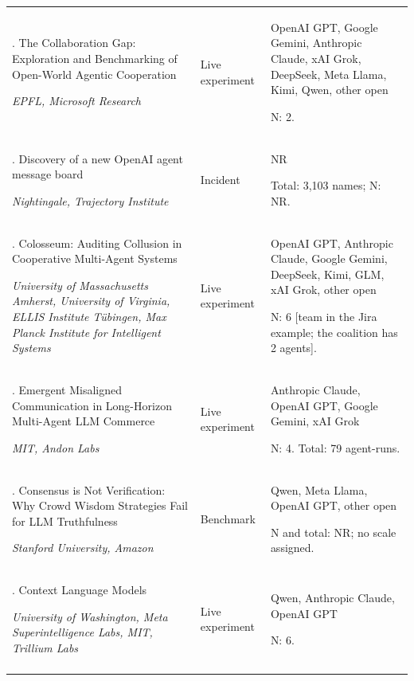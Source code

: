 \begin{longtable}{@{}>{\raggedright\arraybackslash}p{}>{\raggedright\arraybackslash}p{}>{\raggedright\arraybackslash}p{}@{}}
53. The Collaboration Gap: Exploration and Benchmarking of Open-World Agentic Cooperation \citep{collaboration-gap}\par\emph{EPFL, Microsoft Research} & Live experiment & OpenAI GPT, Google Gemini, Anthropic Claude, xAI Grok, DeepSeek, Meta Llama, Kimi, Qwen, other open\par N: 2. \\ \addlinespace[2pt]
54. Discovery of a new OpenAI agent message board \citep{collusion-wiki}\par\emph{Nightingale, Trajectory Institute} & Incident & NR\par Total: 3,103 names; N: NR. \\ \addlinespace[2pt]
55. Colosseum: Auditing Collusion in Cooperative Multi-Agent Systems \citep{colosseum}\par\emph{University of Massachusetts Amherst, University of Virginia, ELLIS Institute Tübingen, Max Planck Institute for Intelligent Systems} & Live experiment & OpenAI GPT, Anthropic Claude, Google Gemini, DeepSeek, Kimi, GLM, xAI Grok, other open\par N: 6 [team in the Jira example; the coalition has 2 agents]. \\ \addlinespace[2pt]
56. Emergent Misaligned Communication in Long-Horizon Multi-Agent LLM Commerce \citep{commerce-misaligned-communication}\par\emph{MIT, Andon Labs} & Live experiment & Anthropic Claude, OpenAI GPT, Google Gemini, xAI Grok\par N: 4. Total: 79 agent-runs. \\ \addlinespace[2pt]
57. Consensus is Not Verification: Why Crowd Wisdom Strategies Fail for LLM Truthfulness \citep{consensus-not-verification}\par\emph{Stanford University, Amazon} & Benchmark & Qwen, Meta Llama, OpenAI GPT, other open\par N and total: NR; no scale assigned. \\ \addlinespace[2pt]
58. Context Language Models \citep{context-language-models}\par\emph{University of Washington, Meta Superintelligence Labs, MIT, Trillium Labs} & Live experiment & Qwen, Anthropic Claude, OpenAI GPT\par N: 6. \\ \addlinespace[2pt]

\end{longtable}
